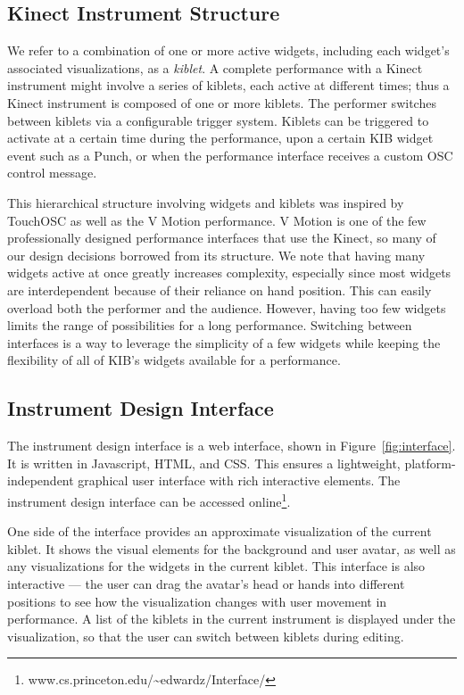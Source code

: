 \documentclass{nime-alternate}
\begin{document}
\subsection{Kinect Instrument Structure}
We refer to a combination of one or more active widgets, including each widget's associated visualizations, as a 
\textit{kiblet}. A complete performance with a Kinect instrument might involve a series 
of kiblets, each active at different times; thus a Kinect instrument is composed of one or more kiblets. 
The performer switches between kiblets via a
configurable trigger system. Kiblets can be triggered to activate at a certain time during the
performance, upon a certain KIB widget event such as a Punch, or when the performance interface
receives a custom OSC control message. 

This hierarchical structure involving widgets and kiblets was inspired by TouchOSC as well as the V Motion 
performance. V Motion is one of the few professionally designed performance interfaces that use the Kinect,
so many of our design decisions borrowed from its structure. We note that having many
widgets active at once greatly increases complexity, especially since most widgets 
are interdependent because of their reliance on hand position.
This can easily overload both the performer and the audience.
However, having too few widgets limits the range of possibilities for a long
performance. Switching between interfaces is a way to leverage the simplicity of
a few widgets while keeping the flexibility of all of KIB's widgets available for a performance. 

\subsection{Instrument Design Interface}
The instrument design interface is a web interface, shown in Figure~\ref{fig:interface}. It is written in Javascript,
HTML, and CSS. This ensures a lightweight, platform-independent graphical user interface
with rich interactive elements. The instrument design interface can be accessed online\footnote{www.cs.princeton.edu/\textasciitilde{}edwardz/Interface/}.

One side of the interface provides an approximate visualization of the current kiblet. It shows the visual
elements for the background and user avatar, as well as any visualizations for the widgets
in the current kiblet. This interface is also interactive --- the user can drag the avatar's head or hands
into different positions to see how the visualization changes with user movement in performance.
A list of the kiblets in the current instrument is displayed under the visualization, so
that the user can switch between kiblets during editing.
\end{document}
